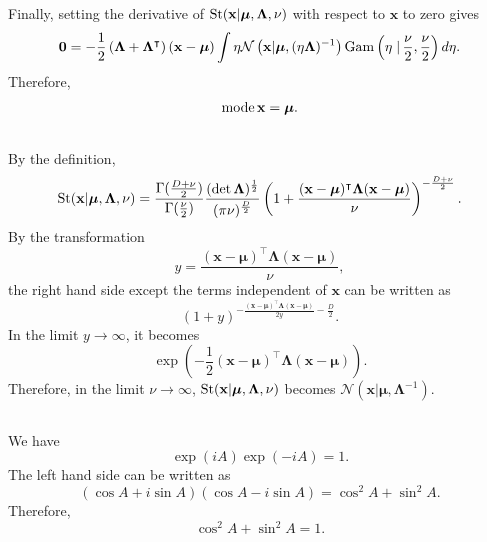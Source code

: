 Finally, setting the derivative of ${\rm St}(\mathbf{x} | \bm{\mu}, \bm{\Lambda}, \nu)$ with respect to $\mathbf{x}$ to zero gives
%
\begin{equation}
\mathbf{0}
=
-
\frac{1}{2}
\left(
	\bm{\Lambda}
	+
	\bm{\Lambda} ^ \intercal
\right)
(\mathbf{x} - \bm{\mu})
\int
\eta
\mathcal{N} 
\left(
	\mathbf{x} 
	| 
	\bm{\mu}, 
	(\eta \bm{\Lambda}) ^ {- 1}
\right)
{\rm Gam} 
\left(
	\eta 
	\left.
	\right \vert
	\frac{\nu}{2}, 
	\frac{\nu}{2}
\right)
d\eta.
\end{equation}
%
Therefore,
%
\begin{equation}
\operatorname{mode} \mathbf{x}
=
\bm{\mu}.
\end{equation}
%


\subsection{}
\label{2.50}
By the definition,
%
\begin{equation}
{\rm St} (\mathbf{x} | \bm{\mu}, \bm{\Lambda}, \nu)
=
\frac{\Gamma(\frac{D + \nu}{2})}{\Gamma (\frac{\nu}{2})}
\frac{(\det \bm{\Lambda}) ^ \frac{1}{2}}{(\pi \nu) ^ \frac{D}{2}}
\left(
	1 
	+ 
	\frac
	{
	(\mathbf{x} - \bm{\mu}) ^ \intercal 
	\bm{\Lambda} 
	(\mathbf{x} - \bm{\mu})
	}
	{\nu}
\right) ^ {- \frac{D + \nu}{2}}.
\end{equation}
%
By the transformation
%
\begin{equation}
y
=
\frac
{
(\mathbf{x} - \bm{\mu}) ^ \intercal 
\bm{\Lambda} 
(\mathbf{x} - \bm{\mu})
}
{\nu},
\end{equation}
%
the right hand side except the terms independent of $\mathbf{x}$ can be written as
%
\begin{equation}
(1 + y) ^ 
{
- 
\frac
{
(\mathbf{x} - \bm{\mu}) ^ \intercal 
\bm{\Lambda} 
(\mathbf{x} - \bm{\mu})
}
{2y} 
- 
\frac{D}{2}
}.
\end{equation}
%
In the limit $y \to \infty$, it becomes
%
\begin{equation}
\exp 
\left(
	-
	\frac{1}{2}
	(\mathbf{x} - \bm{\mu}) ^ \intercal 
	\bm{\Lambda} 
	(\mathbf{x} - \bm{\mu})
\right).
\end{equation}
%
Therefore, in the limit $\nu \to \infty$, ${\rm St}(\mathbf{x} | \bm{\mu}, \bm{\Lambda}, \nu)$ becomes $\mathcal{N} (\mathbf{x} | \bm{\mu}, \bm{\Lambda} ^ {- 1})$.


\subsection{}
\label{2.51}
We have
%
\begin{equation}
\exp (i A) 
\exp (- i A)
=
1.
\end{equation}
%
The left hand side can be written as
%
\begin{equation}
(\cos A + i \sin A)
(\cos A - i \sin A)
=
\cos ^ 2 A 
+ 
\sin ^ 2 A. 
\end{equation}
%
Therefore,
%
\begin{equation}
\cos ^ 2 A 
+ 
\sin ^ 2 A
=
1.
\end{equation}
%

